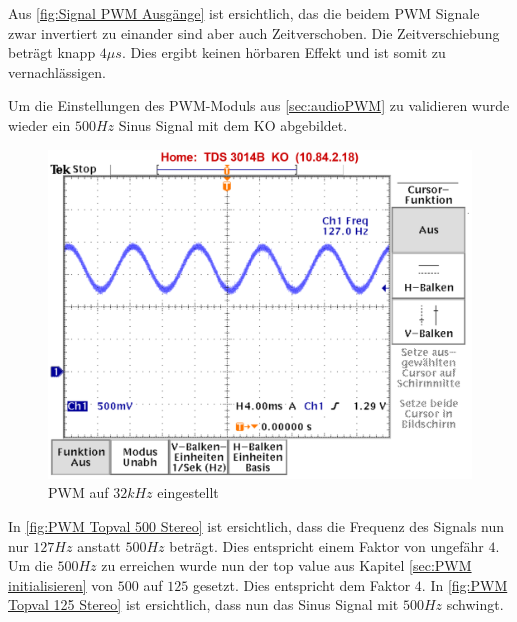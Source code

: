 Aus \autoref{fig:Signal PWM Ausgänge} ist ersichtlich, das die beidem PWM Signale zwar invertiert zu einander sind aber auch Zeitverschoben. Die Zeitverschiebung beträgt knapp $4\mu s$. Dies ergibt keinen hörbaren Effekt und ist somit zu vernachlässigen.

Um die Einstellungen des PWM-Moduls aus \ref{sec:audioPWM} zu validieren wurde wieder ein $500Hz$ Sinus Signal mit dem KO abgebildet.


\begin{figure}
\center
\includegraphics[scale=1.0]{data/TOPVAL_Stereo_500.png}
\caption{PWM auf $32kHz$ eingestellt}
\label{fig:PWM Topval 500 Stereo}
\end{figure}

In \autoref{fig:PWM Topval 500 Stereo} ist ersichtlich, dass die Frequenz des Signals nun nur $127Hz$ anstatt $500Hz$ beträgt. Dies entspricht einem Faktor von ungefähr $4$. Um die $500Hz$ zu erreichen wurde nun der top value aus Kapitel \ref{sec:PWM initialisieren} von $500$ auf $125$ gesetzt. Dies entspricht dem Faktor $4$. In \autoref{fig:PWM Topval 125 Stereo} ist ersichtlich, dass nun das Sinus Signal mit $500Hz$ schwingt.
\newpage

